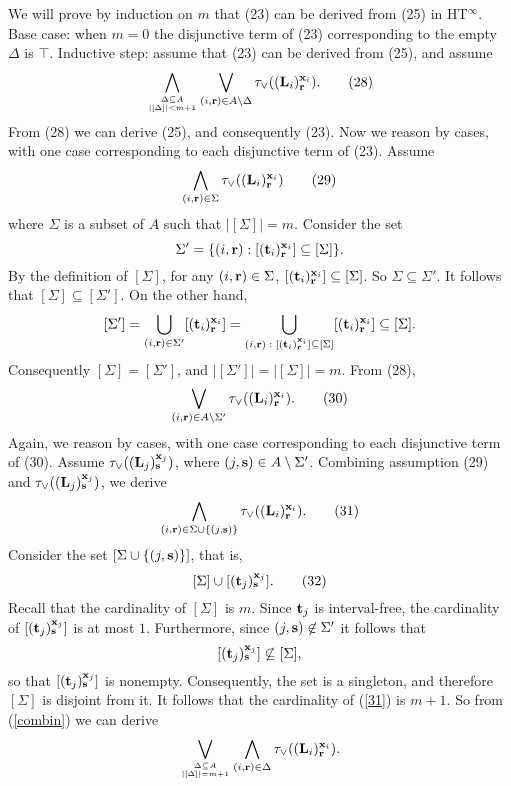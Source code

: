 \documentclass{tlp_mod}
\def\beq{\begin{equation}}
\def\eeq#1{\label{#1}\end{equation}}
\begin{document}
\begin{proof*}
We will prove by induction on $m$ that   
(23) can be derived from (25) in HT\/$^\infty$.
Base case: when $m = 0$ the disjunctive term of (23) 
corresponding to the empty $\Delta$ is $\top$. 
Inductive step: assume that (23) can be derived from 
(25), and assume 
\[
  \bigwedge_{\Delta \subseteq A \atop \lvert [\Delta]\rvert < m + 1}  
  \bigvee_{(i,{\bf r}) \in A\setminus\Delta}
  \tau_{\lor}(({\bf L}_i)^{{\bf x}_i}_{\bf r}).
\tag{28}
\label{monok}
\]
From (28) we can derive (25), and consequently
(23). 
Now we reason by cases, with one case corresponding to each disjunctive
term of (23). 
Assume 
\[
  \bigwedge_{(i,{\bf r}) \in \Sigma}
  \tau_{\lor}(({\bf L}_i)^{{\bf x}_i}_{\bf r})
\tag{29}
\label{dterm2}
\]
where $\Sigma$ is a subset of $A$ such that $\lvert [\Sigma]\rvert = m$.
Consider the set  
$$\Sigma' = \{(i, {\bf r}) : [({\bf t}_i)^{{\bf x}_i}_{\bf r}] 
\subseteq [\Sigma]\}.$$
By the definition of $[\Sigma]$, for any $(i, {\bf r}) \in \Sigma$, 
$[({\bf t}_i)^{{\bf x}_i}_{\bf r}] \subseteq [\Sigma]$. So $\Sigma \subseteq
\Sigma'$. It follows that $[\Sigma] \subseteq [\Sigma']$.
On the other hand,  
$$[\Sigma'] =  
\bigcup_{(i, {\bf r}) \in \Sigma'} [({\bf t}_i)^{{\bf x}_i}_{\bf r}] =
\bigcup_{(i, {\bf r})\;:\;
[({\bf t}_i)^{{\bf x}_i}_{\bf r}] \subseteq [\Sigma]}
[({\bf t}_i)^{{\bf x}_i}_{{\bf r}}] \subseteq [\Sigma].$$
Consequently $[\Sigma] = [\Sigma']$, and
$\lvert [\Sigma'] \rvert = \lvert [\Sigma] \rvert = m.$ 
From (28),
\[
  \bigvee_{(i,{\bf r}) \in A\setminus\Sigma'}
  \tau_{\lor}(({\bf L}_i)^{{\bf x}_i}_{\bf r}).
\tag{30}
\label{monok_res}
\]
Again, we reason by cases, with one case corresponding to each disjunctive
term of (30). Assume $\tau_{\lor}(({\bf L}_j)^
{{\bf x}_j}_{\bf s})$, where $(j, {\bf s}) \in A \setminus \Sigma'$.
Combining assumption (29) and $\tau_{\lor}(({\bf L}_j)^
{{\bf x}_j}_{\bf s})$, we derive 
\[
  \bigwedge_{(i, {\bf r}) \in \Sigma \cup \{(j,{\bf s})\}}
  \tau_{\lor}(({\bf L}_i)^{{\bf x}_i}_{\bf r}). 
\tag{31}
\label{combin}
\]
Consider the set $[\Sigma \cup \{(j, {\bf s})\}]$, that is,
\[
[\Sigma] \cup [({\bf t}_j)^{{\bf x}_j}_{\bf s}].
\tag{32}
\label{31} 
\]
Recall that the cardinality
of $[\Sigma]$ is $m$. Since ${\bf t}_j$ is interval-free, 
the cardinality of $[({\bf t}_j)^{{\bf x}_j}_{\bf s}]$ is at most $1$. 
Furthermore,  
since $(j, {\bf s}) \not \in \Sigma'$ it follows that 
$$[({\bf t}_j)^{{\bf x}_j}_{\bf s}] \not \subseteq [\Sigma],$$
so that $[({\bf t}_j)^{{\bf x}_j}_{\bf s}]$ is nonempty.
Consequently,
the set is a singleton,  
and therefore $[\Sigma]$ is disjoint from it. 
It follows that the cardinality of (\ref{31}) is $m+1$. 
So from (\ref{combin}) we can derive 
$$
  \bigvee_{\Delta\subseteq A \atop \lvert [\Delta] \rvert = m+1}  
  \bigwedge_{(i,{\bf r}) \in \Delta}
  \tau_{\lor}(({\bf L}_i)^{{\bf x}_i}_{\bf r}).
$$
\end{proof*}
\end{document}
